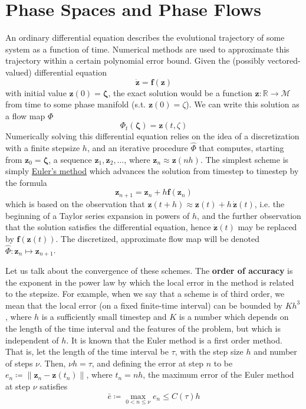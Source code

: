 \section{Phase Spaces and Phase Flows}

    An ordinary differential equation describes the evolutional trajectory of some system as a function of time. Numerical methods are used to approximate this trajectory within a certain polynomial error bound. Given the (possibly vectored-valued) differential equation 
    \begin{equation}
      \mathbf{\dot{z}} = \mathbf{f}(\mathbf{z})
    \end{equation}
    with initial value $\mathbf{z}(0) = \boldsymbol{\zeta}$, the exact solution would be a function $\mathbf{z}: \mathbb{R} \to \mathcal{M}$ from time to some phase manifold (s.t. $\mathbf{z}(0) = \zeta$). We can write this solution as a flow map $\Phi$
    \begin{equation}
      \Phi_t (\boldsymbol{\zeta}) = \mathbf{z}(t, \zeta)
    \end{equation}
    Numerically solving this differential equation relies on the idea of a discretization with a finite stepsize $h$, and an iterative procedure $\hat{\Phi}$ that computes, starting from $\mathbf{z}_0 = \boldsymbol{\zeta}$, a sequence $\mathbf{z}_1, \mathbf{z}_2, \ldots$, where $\mathbf{z}_n \approx \mathbf{z}(n h)$. The simplest scheme is simply \hyperref[ode-thm:eulers-method]{Euler's method} which advances the solution from timestep to timestep by the formula 
    \begin{equation}
      \mathbf{z}_{n+1} = \mathbf{z}_n + h \mathbf{f}(\mathbf{z}_n)
    \end{equation}
    which is based on the observation that $\mathbf{z}(t + h) \approx \mathbf{z}(t) + h\, \boldsymbol{\dot{z}}(t)$, i.e. the beginning of a Taylor series expansion in powers of $h$, and the further observation that the solution satisfies the differential equation, hence $\boldsymbol{\dot{z}}(t)$ may be replaced by $\mathbf{f}(\mathbf{z}(t))$. The discretized, approximate flow map will be denoted $\hat{\Phi}: \mathbf{z}_n \mapsto \mathbf{z}_{n+1}$. 

    Let us talk about the convergence of these schemes. The \textbf{order of accuracy} is the exponent in the power law by which the local error in the method is related to the stepsize. For example, when we say that a scheme is of third order, we mean that the local error (on a fixed finite-time interval) can be bounded by $K h^3$, where $h$ is a sufficiently small timestep and $K$ is a number which depends on the length of the time interval and the features of the problem, but which is independent of $h$. It is known that the Euler method is a first order method. That is, let the length of the time interval be $\tau$, with the step size $h$ and number of steps $\nu$. Then, $\nu h = \tau$, and defining the error at step $n$ to be $e_n \coloneqq \|\mathbf{z}_n - \mathbf{z}(t_n)\|$, where $t_n = n h$, the maximum error of the Euler method at step $\nu$ satisfies
    \begin{equation}
      \bar{e} \coloneqq \max_{0 < n \leq \nu} e_n \leq C(\tau) h
    \end{equation}


